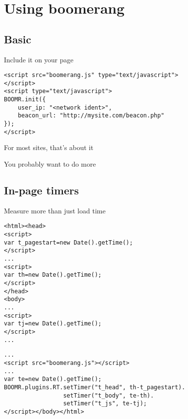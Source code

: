 \documentclass{beamer}
\begin{document}
\section{Using boomerang}

\subsection{Basic}

\begin{frame}[fragile]{Include it on your page}
  \begin{verbatim}
<script src="boomerang.js" type="text/javascript">
</script>
<script type="text/javascript">
BOOMR.init({
    user_ip: "<network ident>",
    beacon_url: "http://mysite.com/beacon.php"
});
</script>
  \end{verbatim}
\end{frame}

\begin{frame}{}
  \begin{center}
  For most sites, that's about it
  \end{center}
\end{frame}

\begin{frame}{}
  \begin{center}
  You probably want to do more
  \end{center}
\end{frame}

\subsection{In-page timers}
\begin{frame}[fragile]{Measure more than just load time}
\begin{verbatim}
<html><head>
<script>
var t_pagestart=new Date().getTime();
</script>
...
<script>
var th=new Date().getTime();
</script>
</head>
<body>
...
<script>
var tj=new Date().getTime();
</script>
...
\end{verbatim}
\end{frame}

\begin{frame}[fragile]{}
\begin{verbatim}
...
<script src="boomerang.js"></script>
...
var te=new Date().getTime();
BOOMR.plugins.RT.setTimer("t_head", th-t_pagestart).
                 setTimer("t_body", te-th).
                 setTimer("t_js", te-tj);
</script></body></html>
\end{verbatim}
\end{frame}
\end{document}
